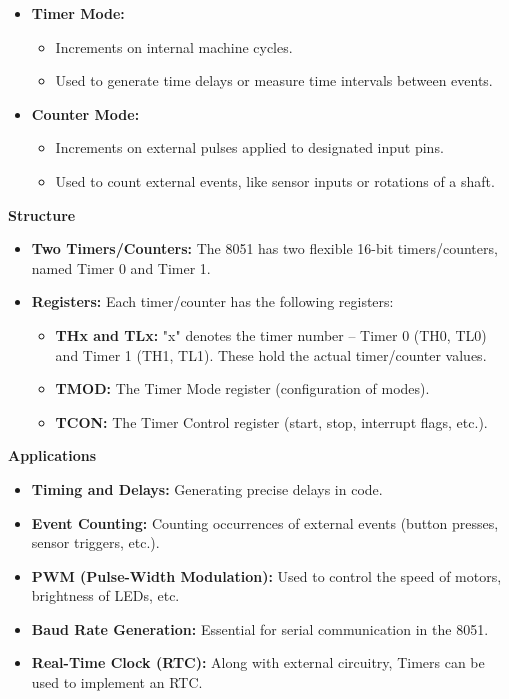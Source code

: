 \documentclass[
]{article}
\begin{document}
\begin{itemize}
\item
  \textbf{Timer Mode:}

  \begin{itemize}
  \item
    Increments on internal machine cycles.
  \item
    Used to generate time delays or measure time intervals between
    events.
  \end{itemize}
\item
  \textbf{Counter Mode:}

  \begin{itemize}
  \item
    Increments on external pulses applied to designated input pins.
  \item
    Used to count external events, like sensor inputs or rotations of a
    shaft.
  \end{itemize}
\end{itemize}

\textbf{Structure}

\begin{itemize}
\item
  \textbf{Two Timers/Counters:} The 8051 has two flexible 16-bit
  timers/counters, named Timer 0 and Timer 1.
\item
  \textbf{Registers:} Each timer/counter has the following registers:

  \begin{itemize}
  \item
    \textbf{THx and TLx:} "x" denotes the timer number -- Timer 0 (TH0,
    TL0) and Timer 1 (TH1, TL1). These hold the actual timer/counter
    values.
  \item
    \textbf{TMOD:} The Timer Mode register (configuration of modes).
  \item
    \textbf{TCON:} The Timer Control register (start, stop, interrupt
    flags, etc.).
  \end{itemize}
\end{itemize}

\textbf{Applications}

\begin{itemize}
\item
  \textbf{Timing and Delays:} Generating precise delays in code.
\item
  \textbf{Event Counting:} Counting occurrences of external events
  (button presses, sensor triggers, etc.).
\item
  \textbf{PWM (Pulse-Width Modulation):} Used to control the speed of
  motors, brightness of LEDs, etc.
\item
  \textbf{Baud Rate Generation:} Essential for serial communication in
  the 8051.
\item
  \textbf{Real-Time Clock (RTC):} Along with external circuitry, Timers
  can be used to implement an RTC.
\end{itemize}
\end{document}
